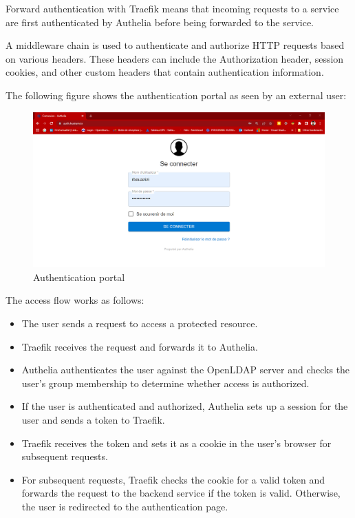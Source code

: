 \hspace{7mm}Forward authentication with Traefik means that incoming requests to a service are first authenticated by Authelia before being forwarded to the service.

\hspace{7mm}A middleware chain is used to authenticate and authorize HTTP requests based on various headers. These headers can include the Authorization header, session cookies, and other custom headers that contain authentication information. 

\hspace{7mm}The following figure shows the authentication portal as seen by an external user: 
\begin{figure}[H]\centering
\includegraphics[width=1.0\textwidth,angle=00]{assets/f55.png}
\caption{Authentication portal}
\label{fig:f55}
\end{figure}

\hspace{7mm}The access flow works as follows: 
\begin{itemize}[label={--}]
\item The user sends a request to access a protected resource. 
\item  Traefik receives the request and forwards it to Authelia. 
\item  Authelia authenticates the user against the OpenLDAP server and checks the user's group membership to determine whether access is authorized. 
\item  If the user is authenticated and authorized, Authelia sets up a session for the user and sends a token to Traefik. 
\item  Traefik receives the token and sets it as a cookie in the user's browser for subsequent requests. 
\item  For subsequent requests, Traefik checks the cookie for a valid token and forwards the request to the backend service if the token is valid. Otherwise, the user is redirected to the authentication page.  
\end{itemize}

